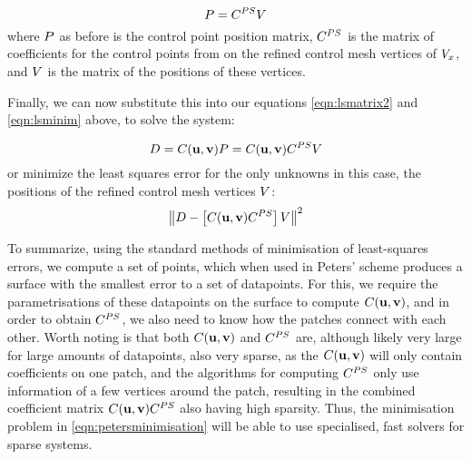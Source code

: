 \begin{equation}
\lsControlPointMatrix = \petersControlPointCoefMatrix\petersPatchPointMatrix
\end{equation}
where $\lsControlPointMatrix$ as before is the \Bez control point position matrix, $\petersControlPointCoefMatrix$ is the matrix of coefficients for the \Bez control points from on the refined control mesh vertices of $\petersPatchPoints$, and $\petersPatchPointMatrix$ is the matrix of the positions of these vertices. 

Finally, we can now substitute this into our equations \ref{eqn:lsmatrix2} and \ref{eqn:lsminim} above, to solve the system:

\begin{equation}
\lsDataPointMatrix = \lsControlPointCoefMatrix(\vec{u},\vec{v})\lsControlPointMatrix = \lsControlPointCoefMatrix(\vec{u},\vec{v})\petersControlPointCoefMatrix\petersPatchPointMatrix
\end{equation}
or minimize the least squares error for the only unknowns in this case, the positions of the refined control mesh vertices $\petersPatchPointMatrix$:
\begin{equation}
\norm{\lsDataPointMatrix - \left [\lsControlPointCoefMatrix(\vec{u},\vec{v})\petersControlPointCoefMatrix\right ]\petersPatchPointMatrix}^2
\label{eqn:petersminimisation}
\end{equation}

To summarize, using the standard methods of minimisation of least-squares errors, we compute a set of points, which when used in Peters' scheme produces a surface with the smallest error to a set of datapoints. For this, we require the parametrisations of these datapoints on the surface to compute $\lsControlPointCoefMatrix(\vec{u},\vec{v})$, and in order to obtain $\petersControlPointCoefMatrix$, we also need to know how the patches connect with each other. 
Worth noting is that both $\lsControlPointCoefMatrix(\vec{u},\vec{v})$ and $\petersControlPointCoefMatrix$ are, although likely very large for large amounts of datapoints, also very sparse, as the $\lsControlPointCoefMatrix(\vec{u},\vec{v})$ will only contain coefficients on one patch, and the algorithms for computing $\petersControlPointCoefMatrix$ only use information of a few vertices around the patch, resulting in the combined coefficient matrix $\lsControlPointCoefMatrix(\vec{u},\vec{v})\petersControlPointCoefMatrix$ also having high sparsity. Thus, the minimisation problem in \autoref{eqn:petersminimisation} will be able to use specialised, fast solvers for sparse systems.
